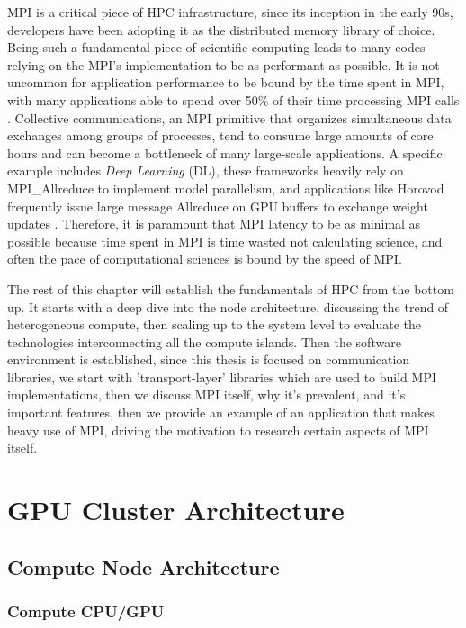 MPI is a critical piece of HPC infrastructure, since its inception in the early 90s, developers have been adopting it as the distributed memory library of choice.
Being such a fundamental piece of scientific computing leads to many codes relying on the MPI's implementation to be as performant as possible.  
It is not uncommon for application performance to be bound by the time spent in MPI, with many applications able to spend over 50\% of their time processing MPI calls \cite{Chunduri2018CharacterizeMPIonProd}.
Collective communications, an MPI primitive that organizes simultaneous data exchanges among groups of processes, tend to consume large amounts of core hours and can become a bottleneck of many large-scale applications.
A specific example includes \textit{Deep Learning} (DL), these frameworks heavily rely on MPI\_Allreduce to implement model parallelism, and applications like Horovod frequently issue large message Allreduce on GPU buffers to exchange weight updates \cite{Awan2019CommProfDLonClusters, Jain2019PerfCharDNNTFPT, Alizadeh2022PAPCollDL}.
Therefore, it is paramount that MPI latency to be as minimal as possible because time spent in MPI is time wasted not calculating science, and often the pace of computational sciences is bound by the speed of MPI.

The rest of this chapter will establish the fundamentals of HPC from the bottom up.
It starts with a deep dive into the node architecture, discussing the trend of heterogeneous compute, then scaling up to the system level to evaluate the technologies interconnecting all the compute islands.
Then the software environment is established, since this thesis is focused on communication libraries, we start with 'transport-layer' libraries which are used to build MPI implementations, then we discuss MPI itself, why it's prevalent, and it's important features, then we provide an example of an application that makes heavy use of MPI, driving the motivation to research certain aspects of MPI itself.


\section{GPU Cluster Architecture}
    \subsection{Compute Node Architecture}
    \subsubsection{Compute CPU/GPU}
